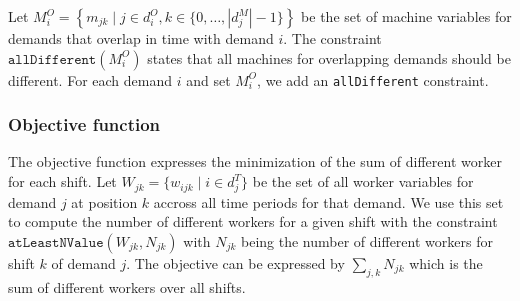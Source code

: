 \documentclass[../../thesis.tex]{subfiles}
\begin{document}
Let $M^O_i = \left\{ m_{jk} \mid j \in d^O_i, k \in \{0, \dots, |d^M_j| - 1 \} \right\}$ be the set of machine variables for demands that overlap in time 
with demand $i$. The constraint $\texttt{allDifferent}(M^O_i)$ states that all machines for overlapping demands 
should be different. For each demand $i$ and set $M^O_i$, we add an \texttt{allDifferent} constraint.

\subsubsection{Objective function}

The objective function expresses the minimization of the sum of different worker for each shift.
Let $W_{jk} = \{ w_{ijk} \mid i \in d^T_j \}$ be the set of all worker variables for demand $j$ at position $k$ accross all time periods for that demand.
We use this set to compute the number of different workers for a given shift with the constraint
$\texttt{atLeastNValue}(W_{jk}, N_{jk})$ with $N_{jk}$ being the number of different workers for shift $k$ of demand $j$.
The objective can be expressed by $\sum_{j, k} N_{jk}$ which is the sum of different workers over all shifts. 
\end{document}
